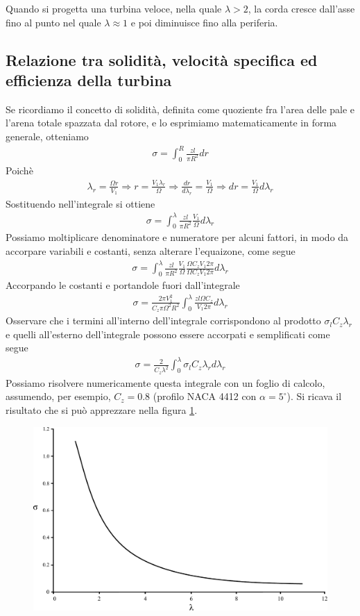 Quando si progetta una turbina veloce, nella quale $\lambda > 2$, la corda cresce dall'asse fino al punto nel quale $\lambda \approx 1$ e poi diminuisce fino alla periferia. 

\subsection{Relazione tra solidità, velocità specifica ed efficienza della turbina}
Se ricordiamo il concetto di solidità, definita come quoziente fra l'area delle pale e l'arena totale spazzata dal rotore, e lo esprimiamo matematicamente in forma generale, otteniamo
\begin{align*}
\sigma = \int_0^R \frac{z l }{\pi R^2} dr
\end{align*}
Poichè
\begin{align*}
\lambda_r = \frac{\Omega r}{V_1} \Rightarrow r = \frac{V_1 \lambda_r}{\Omega} \Rightarrow \frac{dr}{d \lambda_r} = \frac{V_1}{\Omega} \Rightarrow dr = \frac{V_1}{\Omega} d\lambda_r
\end{align*}
Sostituendo nell'integrale si ottiene
\begin{align*}
\sigma = \int_0^{\lambda} \frac{z l}{\pi R^2} \frac{V_1}{\Omega} d\lambda_r
\end{align*}
Possiamo moltiplicare denominatore e numeratore per alcuni fattori, in modo da accorpare variabili e costanti, senza alterare l'equaizone, come segue
\begin{align*}
\sigma = \int_0^{\lambda} \frac{z l}{\pi R^2} \frac{V_1}{\Omega} \frac{\Omega C_z V_1 2 \pi}{\Omega C_z V_1 2 \pi} d \lambda_r
\end{align*}
Accorpando le costanti e portandole fuori dall'integrale
\begin{align*}
\sigma = \frac{2 \pi V_1^2}{C_z \pi \Omega^2 R^2} \int_0^{\lambda} \frac{z l \Omega C_z}{V_1 2 \pi} d \lambda_r
\end{align*}
Osservare che i termini all'interno dell'integrale corrispondono al prodotto $\sigma_l C_z \lambda_r$ e quelli all'esterno dell'integrale possono essere accorpati e semplificati come segue
\begin{align*}
\sigma = \frac{2}{C_z \lambda^2} \int_0^{\lambda} \sigma_l C_z \lambda_r d \lambda_r
\end{align*}
Possiamo risolvere numericamente questa integrale con un foglio di calcolo, assumendo, per esempio, $C_z = 0.8$ (profilo NACA 4412 con $\alpha = 5^\circ$). Si ricava il risultato che si può apprezzare nella figura \ref{fig:sigmalambda}.
\begin{figure}[h!]
\centering
  \includegraphics[width=.7\textwidth]{fig/sigmalambda.pdf}
\caption{}
\label{fig:sigmalambda}
\end{figure}
